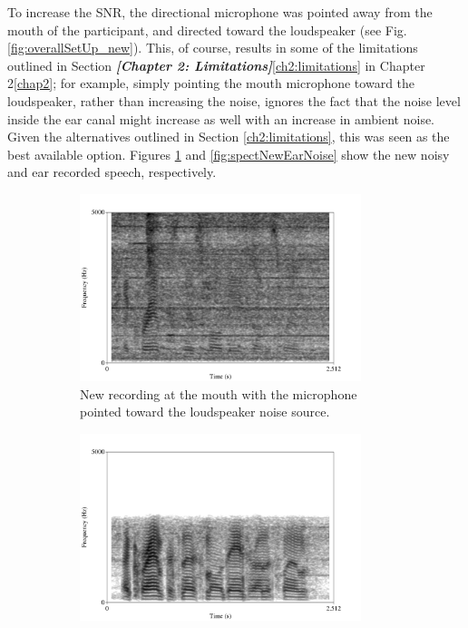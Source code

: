 \documentclass[dissertation,copyright]{uathesis}
\begin{document}
To increase the SNR, the directional microphone was pointed away from the mouth of the participant, and directed toward the loudspeaker (see Fig. \ref{fig:overallSetUp_new}).  This, of course, results in some of the limitations outlined in Section \textit{\textbf{[Chapter 2: Limitations]}}\ref{ch2:limitations} in Chapter 2\ref{chap2}; for example, simply pointing the mouth microphone toward the loudspeaker, rather than increasing the noise, ignores the fact that the noise level inside the ear canal might increase as well with an increase in ambient noise.  Given the alternatives outlined in Section \ref{ch2:limitations}, this was seen as the best available option.  Figures \ref{fig:spectNewMouthNoise} and \ref{fig:spectNewEarNoise} show the new noisy and ear recorded speech, respectively.
%
\begin{figure}
\begin{subfigure}{0.5\textwidth}
  \centering
  \includegraphics[width=0.9\textwidth]{figure/spectNewMouthNoise.png}
  \caption{New recording at the mouth with the microphone pointed toward the loudspeaker noise source.}
  \label{fig:spectNewMouthNoise}
\end{subfigure}
%
\begin{subfigure}{0.5\textwidth}
  \centering
  \includegraphics[width=0.9\textwidth]{figure/spectNewEarNoise.png}

\end{subfigure}
\end{figure}
\end{document}
